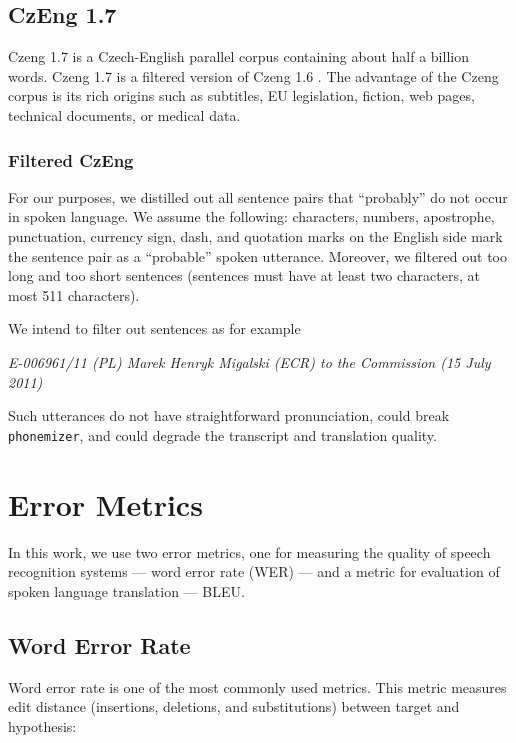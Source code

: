 \subsection{CzEng 1.7}
Czeng 1.7 is a Czech-English parallel corpus containing about half a billion words. Czeng 1.7 is a filtered version of Czeng 1.6 . The advantage of the Czeng corpus is its rich origins such as subtitles, EU legislation, fiction, web pages, technical documents, or medical data. 

\subsubsection{Filtered CzEng}
\label{filtered_czeng}
For our purposes, we distilled out all sentence pairs that ``probably'' do not occur in spoken language. We assume the following: characters, numbers, apostrophe, punctuation, currency sign, dash, and quotation marks on the English side mark the sentence pair as a ``probable'' spoken utterance. Moreover, we filtered out too long and too short sentences (sentences must have at least two characters, at most 511 characters).

We intend to filter out sentences as for example \\

\begin{minipage}{0.95\linewidth}
	\small\emph{E-006961/11 (PL) Marek Henryk Migalski (ECR) to the Commission (15 July 2011)}\\
\end{minipage}


Such utterances do not have straightforward pronunciation, could break \texttt{phone\-mi\-zer}, and could degrade the transcript and translation quality.

\section{Error Metrics}
In this work, we use two error metrics, one for measuring the quality of speech recognition systems --- word error rate (WER) --- and a metric for evaluation of spoken language translation --- BLEU.

\subsection{Word Error Rate}
Word error rate is one of the most commonly used metrics. This metric measures edit distance (insertions, deletions, and substitutions) between target and hypothesis:

